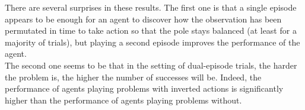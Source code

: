 \begin{figure}
	\centering
	\caption{}
	\label{fig:20permsLR_unseen_distrib}
\end{figure}

There are several surprises in these results. The first one is that a single
episode appears to be enough for an agent to discover how the observation has
been permutated in time to take action so that the pole stays balanced (at least
for a majority of trials), but playing a second episode improves the performance
of the agent.\\

The second one seems to be that in the setting of dual-episode trials, the
harder the problem is, the higher the number of successes will be. Indeed,
the performance of agents playing problems with inverted actions is 
significantly higher than the performance of agents playing problems without.





